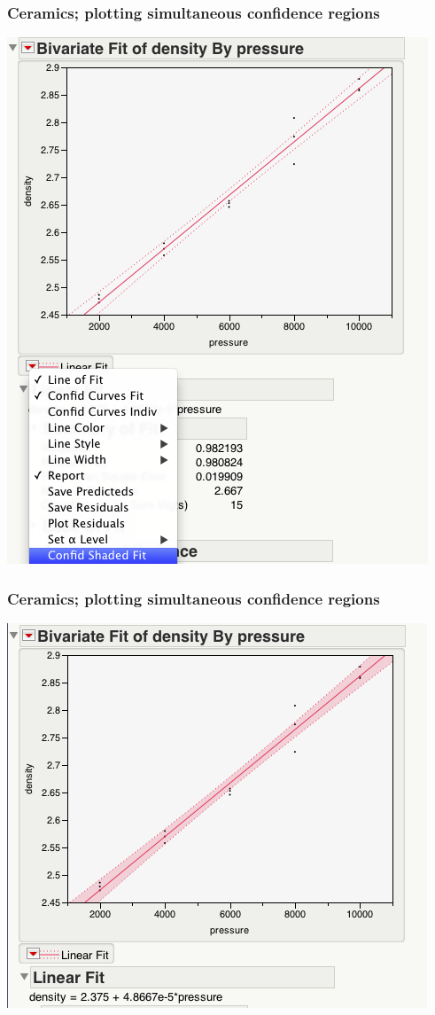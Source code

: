 \documentclass[handout]{beamer}\usepackage[]{graphicx}\usepackage[]{color}
\numberwithin{equation}{section}
\begin{document}
\begin{frame}
\frametitle{Ceramics; plotting simultaneous confidence regions}
 \includegraphics{../../fig/scp3.png}
\end{frame}

\begin{frame}
\frametitle{Ceramics; plotting simultaneous confidence regions}
 \includegraphics{../../fig/scp4.png}
\end{frame}
\end{document}
